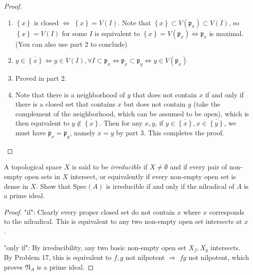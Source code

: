 \documentclass{solution}
\begin{document}
\begin{proof}
    \begin{enumerate}
        \item $\left\lbrace x \right\rbrace$ is closed $\Leftrightarrow$ $\left\lbrace x \right\rbrace = V(I)$. Note that $\left\lbrace x \right\rbrace \subset V(\mathfrak{p}_x) \subset V(I)$, so $\left\lbrace x \right\rbrace = V(I)$ for some $I$ is equivalent to $\left\lbrace x \right\rbrace = V(\mathfrak{p}_x) \Leftrightarrow \mathfrak{p}_x$ is maximal. (You can also use part 2 to conclude)
        \item $y \in \overline{\left\lbrace x \right\rbrace} \Leftrightarrow y \in V(I), \forall I \subset \mathfrak{p}_x \Leftrightarrow \mathfrak{p}_x \subset \mathfrak{p}_y \Leftrightarrow y \in V(\mathfrak{p}_x)$
        \item Proved in part 2.
        \item Note that there is a neighborhood of $y$ that does not contain $x$ if and only if there is a closed set that contains $x$ but does not contain $y$ (take the complement of the neighborhood, which can be assumed to be open), which is then equivalent to $y \notin \overline{\left\lbrace x \right\rbrace}$. Then for any $x, y$, if $y \in \overline{\left\lbrace x \right\rbrace}, x \in \overline{\left\lbrace y \right\rbrace}$, we must have $\mathfrak{p}_x = \mathfrak{p}_y$, namely $x = y$ by part 3. This completes the proof.
    \end{enumerate}
\end{proof}

\begin{problem}
    A topological space $X$ is said to be \textit{irreducible} if $X \ne \emptyset$ and if every pair of non-empty open sets in $X$ intersect, or equivalently if every non-empty open set is dense in $X$. Show that $\mathrm{Spec}(A)$ is irreducible if and only if the nilradical of $A$ is a prime ideal.
\end{problem}

\begin{proof}
    "if": Clearly every proper closed set do not contain $x$ where $x$ corresponds to the nilradical. This is equivalent to any two non-empty open set intersects at $x$.

    "only if": By irreducibility, any two basic non-empty open set $X_f, X_g$ intersects. By Problem 17, this is equivalent to $f, g$ not nilpotent $\Rightarrow$ $fg$ not nilpotent, which proves $\mathfrak{N}_A$ is a prime ideal.
\end{proof}
\end{document}
